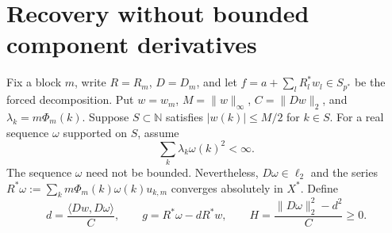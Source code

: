\documentclass[10pt]{amsart}
\begin{document}
\section{Recovery without bounded component derivatives}

Fix a block $m$, write $R=R_m$, $D=D_m$, and let
$f=a+\sum_lR_l^*w_l\in S_{p^*}$ be the forced decomposition.
Put $w=w_m$, $M=\|w\|_\infty$, $C=\|Dw\|_2$, and
$\lambda_k=m\Phi_m(k)$. Suppose $S\subset\mathbb N$ satisfies
$|w(k)|\le M/2$ for $k\in S$. For a real sequence $\omega$
supported on $S$, assume
\begin{equation}\label{eq:weighted-direction}
 \sum_k\lambda_k\omega(k)^2<\infty.
\end{equation}
The sequence $\omega$ need not be bounded. Nevertheless,
$D\omega\in\ell_2$ and the series
$R^*\omega:=\sum_k m\Phi_m(k)\omega(k)u_{k,m}$ converges
absolutely in $X^*$. Define
\[
 d=\frac{\langle Dw,D\omega\rangle}{C},\qquad
 g=R^*\omega-dR^*w,\qquad
 H=\frac{\|D\omega\|_2^2-d^2}{C}\ge0.
\]
\end{document}
